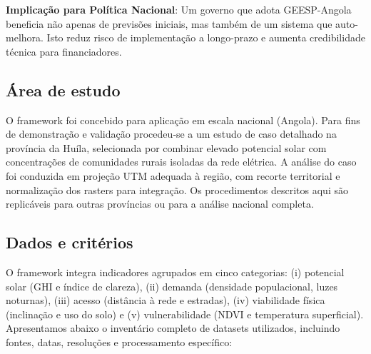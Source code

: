 \documentclass[12pt, a4paper]{article}
\begin{document}
\textbf{Implicação para Política Nacional}: Um governo que adota GEESP-Angola beneficia não apenas de previsões iniciais, mas também de um sistema que auto-melhora. Isto reduz risco de implementação a longo-prazo e aumenta credibilidade técnica para financiadores.

\subsection{Área de estudo}

O framework foi concebido para aplicação em escala nacional (Angola). Para fins de demonstração e validação procedeu‑se a um estudo de caso detalhado na província da Huíla, selecionada por combinar elevado potencial solar com concentrações de comunidades rurais isoladas da rede elétrica. A análise do caso foi conduzida em projeção UTM adequada à região, com recorte territorial e normalização dos rasters para integração. Os procedimentos descritos aqui são replicáveis para outras províncias ou para a análise nacional completa.

\subsection{Dados e critérios}

O framework integra indicadores agrupados em cinco categorias: (i) potencial solar (GHI e índice de clareza), (ii) demanda (densidade populacional, luzes noturnas), (iii) acesso (distância à rede e estradas), (iv) viabilidade física (inclinação e uso do solo) e (v) vulnerabilidade (NDVI e temperatura superficial). Apresentamos abaixo o inventário completo de datasets utilizados, incluindo fontes, datas, resoluções e processamento específico:
\end{document}
